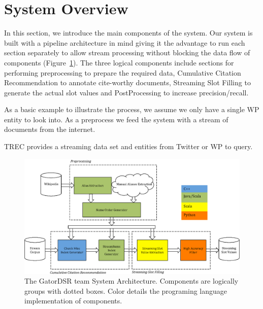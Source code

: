 
\section{System Overview}

In this section, we introduce the main components of the system. Our system is built with a pipeline architecture in mind giving it the advantage to run each section separately to allow stream processing without blocking the data flow of components (Figure~\ref{fig:system}). The three logical components include sections for performing preprocessing to prepare the required data, Cumulative Citation Recommendation to annotate cite-worthy documents, Streaming Slot Filling to generate the actual slot values and PostProcessing to 
increase precision/recall. 

As a basic example to illustrate the process, we assume we only have a single WP entity to look into. As a preprocess we feed the system with a stream of documents from the internet.


TREC provides a streaming data set and  entities from Twitter or WP to query.


\begin{figure}
  \centering
  \includegraphics[width=6in]{./images/sdl-eps-converted-to.pdf}
  \vspace*{-.1in} 
  \caption{The GatorDSR team System Architecture.
  Components are logically groups with dotted boxes.
  Color details the programing language implementation of components.}
  \label{fig:system}
  \vspace*{-.2in}
\end{figure}



